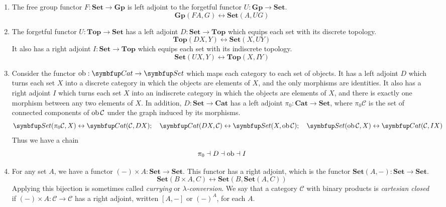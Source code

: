 \begin{example}
    \begin{enumerate}
        \item The free group functor \( F : \mathbf{Set} \to \mathbf{Gp} \) is left adjoint to the forgetful functor \( U : \mathbf{Gp} \to \mathbf{Set} \).
        \[ \mathbf{Gp}(FA, G) \leftrightarrow \mathbf{Set}(A, UG) \]
        \item The forgetful functor \( U : \mathbf{Top} \to \mathbf{Set} \) has a left adjoint \( D : \mathbf{Set} \to \mathbf{Top} \) which equips each set with its discrete topology.
        \[ \mathbf{Top}(DX, Y) \leftrightarrow \mathbf{Set}(X, UY) \]
        It also has a right adjoint \( I : \mathbf{Set} \to \mathbf{Top} \) which equips each set with its indiscrete topology.
        \[ \mathbf{Set}(UX, Y) \leftrightarrow \mathbf{Top}(X, IY) \]
        \item Consider the functor \( \ob : \mathbf{Cat} \to \mathbf{Set} \) which maps each category to each set of objects.
        It has a left adjoint \( D \) which turns each set \( X \) into a discrete category in which the objects are elements of \( X \), and the only morphisms are identities.
        It also has a right adjoint \( I \) which turns each set \( X \) into an indiscrete category in which the objects are elements of \( X \), and there is exactly one morphism between any two elements of \( X \).
        In addition, \( D : \mathbf{Set} \to \mathbf{Cat} \) has a left adjoint \( \pi_0 : \mathbf{Cat} \to \mathbf{Set} \), where \( \pi_0 \mathcal C \) is the set of connected components of \( \operatorname{ob} \mathcal C \) under the graph induced by its morphisms.
        \[ \mathbf{Set}(\pi_0 \mathcal C, X) \leftrightarrow \mathbf{Cat}(\mathcal C, DX);\quad \mathbf{Cat}(D X, \mathcal C) \leftrightarrow \mathbf{Set}(X, \ob \mathcal C);\quad \mathbf{Set}(\ob \mathcal C, X) \leftrightarrow \mathbf{Cat}(\mathcal C, IX) \]
        Thus we have a chain
        \[ \pi_0 \dashv D \dashv \operatorname{ob} \dashv I \]
        \item For any set \( A \), we have a functor \( (-) \times A : \mathbf{Set} \to \mathbf{Set} \).
        This functor has a right adjoint, which is the functor \( \mathbf{Set}(A, -) : \mathbf{Set} \to \mathbf{Set} \).
        \[ \mathbf{Set}(B \times A, C) \leftrightarrow \mathbf{Set}(B, \mathbf{Set}(A, C)) \]
        Applying this bijection is sometimes called \emph{currying} or \emph{\( \lambda \)-conversion}.
        We say that a category \( \mathcal C \) with binary products is \emph{cartesian closed} if \( (-) \times A : \mathcal C \to \mathcal C \) has a right adjoint, written \( [A, -] \) or \( (-)^A \), for each \( A \).

\end{enumerate}
\end{example}
